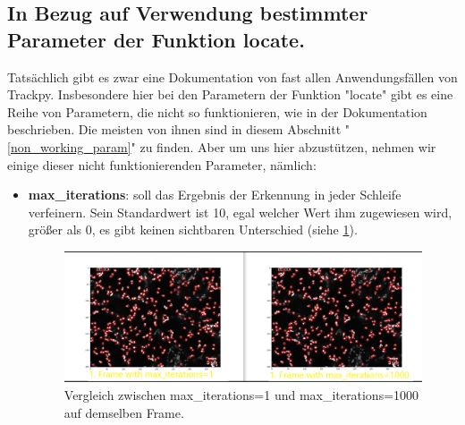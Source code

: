 \newpage

\subsection{In Bezug auf Verwendung bestimmter Parameter der Funktion locate. \label{kap2.2.d_verwendung_locate_param}}
Tatsächlich gibt es zwar eine Dokumentation von fast allen Anwendungsfällen von Trackpy. Insbesondere hier bei den Parametern der Funktion "locate" gibt es eine Reihe von Parametern, die nicht so funktionieren, wie in der Dokumentation beschrieben. 
Die meisten von ihnen sind in diesem Abschnitt "\ref{non_working_param}" zu finden. 
Aber um uns hier abzustützen, nehmen wir einige dieser nicht funktionierenden Parameter, nämlich:

\begin{itemize} 
	\item \textbf{max\_iterations}: soll das Ergebnis der Erkennung in jeder Schleife verfeinern. Sein Standardwert ist 10, egal welcher Wert ihm zugewiesen wird, größer als 0, es gibt keinen sichtbaren Unterschied (siehe \ref{fig:comparison max-iterations}). 
	\begin{figure}[H]
    \centering
    \includegraphics[scale=0.35]{Grafiken/trackpyBilder/comparison max_iterations.png}
    \caption{Vergleich zwischen max\_iterations=1 und max\_iterations=1000 auf demselben Frame.}
    \label{fig:comparison max-iterations}
\end{figure} 
	
\end{itemize}
